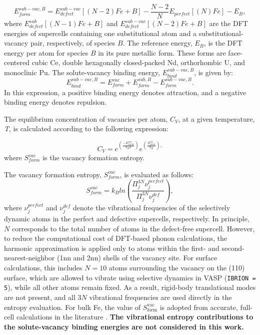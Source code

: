\documentclass[preprint,12pt]{elsarticle}
\providecommand{\DIFaddtex}[1]{{\bf #1}} %
\providecommand{\DIFaddbegin}{\protect\color{blue}} %
\providecommand{\DIFaddend}{\protect\color{black}} %
\providecommand{\DIFadd}[1]{\texorpdfstring{\DIFaddtex{#1}}{#1}} %
\newcommand{\DIFaddincludegraphics}[2][]{{\color{blue}\fbox{\DIFOincludegraphics[#1]{#2}}}} %
\DeclareRobustCommand{\DIFaddbegin}{\DIFOaddbegin \let\includegraphics\DIFaddincludegraphics} %
\DeclareRobustCommand{\DIFaddend}{\DIFOaddend \let\includegraphics\DIFOincludegraphics} %
\begin{document}
\begin{equation}
\label{eq_Ef_vac_sub}
    E_{form}^{sub-vac,B} = E_{defect}^{sub-vac}[(N-2)Fe + B] - \frac{N-2}{N}E_{perfect}[(N) Fe] - E_{B},
\end{equation}
where $E_{defect}^{sub}[(N-1)Fe + B]$ and $E_{defect}^{sub-vac}[(N-2)Fe + B]$ are the DFT energies of supercells containing one substitutional atom and a substitutional-vacancy pair, respectively, of species $B$. The reference energy, $E_{B}$, is the DFT energy per atom for species $B$ in its pure metallic form. These forms are face-centered cubic Ce, double hexagonally closed-packed Nd, orthorhombic U, and monoclinic Pu. The solute-vacancy binding energy, $E_{bind}^{sub-vac,B}$, is given by:
\begin{equation}
\label{eq_Eb}
    E_{bind}^{sub-vac,B} = E_{form}^{vac} + E_{form}^{sub,B} - E_{form}^{sub-vac,B}.
\end{equation}
In this expression, a positive binding energy denotes attraction, and a negative binding energy denotes repulsion. 

The equilibrium concentration of vacancies per atom, $C_V$, at a given temperature, \textit{T}, is calculated according to the following expression:

\begin{equation}
\label{eq:conc_vac}
    C_V = e^{(\frac{-E_{form}^{vac}}{k_B T})} e^{(\frac{S_{form}^{vac}}{k_B}),}
\end{equation}
where $S_{form}^{vac}$ is the vacancy formation entropy. 

The vacancy formation entropy, $S_{form}^{vac}$, is evaluated as follows:
\begin{equation}
    S_{form}^{vac} = k_B ln\left(\frac{\Pi^{3N}_j \nu_j^{perfect}}{\Pi^{3N}_j \nu_j^{def}}\right),
\label{eq_entropy}
\end{equation}
where $\nu_j^{perfect}$ and $\nu_j^{def}$ denote the vibrational frequencies of the selectively dynamic atoms in the perfect and defective supercells, respectively. In principle, $N$ corresponds to the total number of atoms in the defect-free supercell. However, to reduce the computational cost of DFT-based phonon calculations, the harmonic approximation is applied only to atoms within the first- and second-nearest-neighbor (1nn and 2nn) shells of the vacancy site. For surface calculations, this includes $N = 10$ atoms surrounding the vacancy on the (110) surface, which are allowed to vibrate using selective dynamics in VASP (\texttt{IBRION = 5}), while all other atoms remain fixed. As a result, rigid-body translational modes are not present, and all $3N$ vibrational frequencies are used directly in the entropy evaluation. For bulk Fe, the value of $S_{\text{form}}^{\text{vac}}$ is adopted from accurate, full-cell calculations in the literature \cite{messina_systematic_2016}. \DIFaddbegin \DIFadd{The vibrational entropy contributions to the solute-vacancy binding energies are not considered in this work.
}\DIFaddend 
\end{document}
